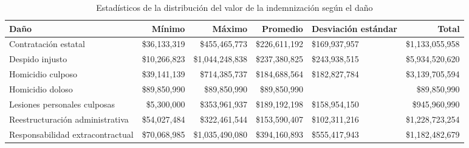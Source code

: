 \begin{table}[htbp]
\centering
\caption{Estadísticos de la distribución del
valor de la indemnización según el daño} 
\label{tab:indemnizacion-dano}
\begin{tabular}{p{3cm}rrrR{2cm}r}
  \hline
Daño & Mínimo & Máximo & Promedio & Desviación estándar & Total \\ 
  \hline
Contratación estatal & \$36,133,319 & \$455,465,773 & \$226,611,192 & \$169,937,957 & \$1,133,055,958 \\ 
  Despido injusto & \$10,266,823 & \$1,044,248,838 & \$237,380,825 & \$243,938,515 & \$5,934,520,620 \\ 
  Homicidio culposo & \$39,141,139 & \$714,385,737 & \$184,688,564 & \$182,827,784 & \$3,139,705,594 \\ 
  Homicidio doloso & \$89,850,990 & \$89,850,990 & \$89,850,990 &  & \$89,850,990 \\ 
  Lesiones personales culposas & \$5,300,000 & \$353,961,937 & \$189,192,198 & \$158,954,150 & \$945,960,990 \\ 
  Reestructuración administrativa & \$54,027,484 & \$322,461,544 & \$153,590,407 & \$102,311,216 & \$1,228,723,254 \\ 
  Responsabilidad extracontractual & \$70,068,985 & \$1,035,490,080 & \$394,160,893 & \$555,417,943 & \$1,182,482,679 \\ 
   \hline
\end{tabular}
\end{table}
